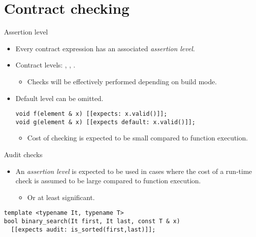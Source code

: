\section{Contract checking}

\begin{frame}[t,fragile]{Assertion level}
\begin{itemize}
  \item Every contract expression has an associated \emph{assertion level}.

  \vfill\pause
  \item Contract levels:
    ,
    ,
    .
    \begin{itemize}
      \item Checks will be effectively performed depending on build mode.
    \end{itemize}

  \vfill\pause
  \item Default level can be omitted.

\begin{lstlisting}
void f(element & x) [[expects: x.valid()]];
void g(element & x) [[expects default: x.valid()]];
\end{lstlisting}

  \vfill\pause
  \begin{itemize}
    \item Cost of  checking is expected to be small compared to function execution.
  \end{itemize}
\end{itemize}
\end{frame}

\begin{frame}[t,fragile]{Audit checks}
\begin{itemize}
  \item An  \emph{assertion level} is expected to be used in cases
where the cost of a run-time check is assumed to be large compared to function
execution.
    \begin{itemize}
      \item Or at least significant.
    \end{itemize}
\end{itemize}
\begin{lstlisting}
template <typename It, typename T>
bool binary_search(It first, It last, const T & x)
  [[expects audit: is_sorted(first,last)]];
\end{lstlisting}
\end{frame}


